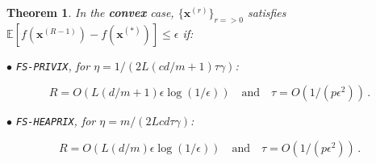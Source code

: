 \documentclass[sigconf, anonymous, review]{acmart}
\newtheorem{theorem}{Theorem}
\begin{document}
\begin{theorem}
In the \textbf{convex} case, $\{ {\boldsymbol{x}}^{(r)}\}_{r=>0}$ satisfies $ \mathbb{E}[f({\boldsymbol{x}}^{(R-1)})-f({\boldsymbol{x}}^{(*)})]\leq \epsilon$ if: 
 
\noindent $\bullet$ \texttt{FS-PRIVIX}, for $\eta=1/(2L(c d/m+1)\tau\gamma)$:  

$$R=O\left(L(d/m+1)\epsilon \log(1/\epsilon)\right) \quad \textrm{and} \quad \tau=O\left(1/(p\epsilon^2)\right)\, .$$

\noindent $\bullet$ \texttt{FS-HEAPRIX}, for $\eta=m/(2L c d\tau\gamma)$: 

$$R=O\left(L(d/m)\epsilon \log(1/\epsilon)\right) \quad \textrm{and} \quad \tau=O\left(1/(p\epsilon^2)\right)\, .$$
 \end{theorem}
\end{document}
